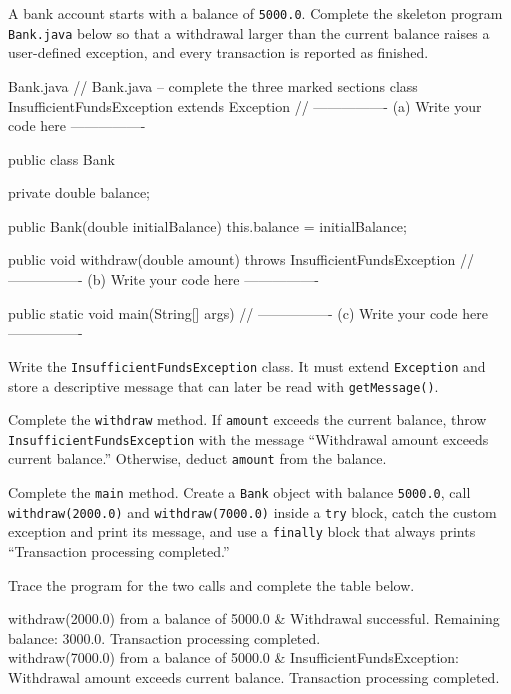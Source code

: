 
\noindent A bank account starts with a balance of \texttt{5000.0}. Complete
the skeleton program \texttt{Bank.java} below so that a withdrawal larger
than the current balance raises a user-defined exception, and every
transaction is reported as finished.

\begin{javafile}{Bank.java}
// Bank.java -- complete the three marked sections
class InsufficientFundsException extends Exception {
    // ---------------- (a) Write your code here ----------------
}

public class Bank {
    private double balance;

    public Bank(double initialBalance) {
        this.balance = initialBalance;
    }

    public void withdraw(double amount) throws InsufficientFundsException {
        // ---------------- (b) Write your code here ----------------
    }

    public static void main(String[] args) {
        // ---------------- (c) Write your code here ----------------
    }
}
\end{javafile}

Write the \texttt{InsufficientFundsException} class. It must extend
\texttt{Exception} and store a descriptive message that can later be read
with \texttt{getMessage()}.

Complete the \texttt{withdraw} method. If \texttt{amount} exceeds
the current balance, throw \texttt{Insufficient\-Funds\-Exception} with the
message ``Withdrawal amount exceeds current balance.'' Otherwise, deduct
\texttt{amount} from the balance.

Complete the \texttt{main} method. Create a \texttt{Bank} object with
balance \texttt{5000.0}, call \texttt{withdraw(2000.0)} and
\texttt{withdraw(7000.0)} inside a \texttt{try} block, catch the custom
exception and print its message, and use a \texttt{finally} block that
always prints ``Transaction processing completed.''

\noindent Trace the program for the two calls and complete the table below.

\begin{iotable}
withdraw(2000.0) from a balance of 5000.0 & Withdrawal successful. Remaining balance: 3000.0. \newline Transaction processing completed. \\ \hline
withdraw(7000.0) from a balance of 5000.0 & Insufficient\-Funds\-Exception: Withdrawal amount exceeds current balance. \newline Transaction processing completed. \\ \hline
\end{iotable}
